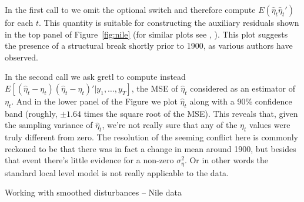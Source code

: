 \documentclass[a4paper]{article}
\begin{document}
In the first call to  we omit the optional switch and
therefore compute $E(\hat{\eta}_t\hat{\eta}_t')$ for each $t$. This
quantity is suitable for constructing the auxiliary residuals shown in
the top panel of Figure~\ref{fig:nile} (for similar plots see
\cite{koopman-etal99}, \cite{pelagatti11}).  This plot suggests the
presence of a structural break shortly prior to 1900, as various
authors have observed.

In the second  call we ask gretl to compute instead
$E[(\hat{\eta}_t-\eta_t)(\hat{\eta}_t-\eta_t)' | y_1,\ldots,y_T]$, the
MSE of $\hat{\eta}_t$ considered as an estimator of $\eta_t$. And in
the lower panel of the Figure we plot $\hat{\eta}_t$ along with a 90\%
confidence band (roughly, $\pm 1.64$ times the square root of the
MSE). This reveals that, given the sampling variance of
$\hat{\eta}_t$, we're not really sure that any of the $\eta_t$ values
were truly different from zero. The resolution of the seeming conflict
here is commonly reckoned to be that there was in fact a change in
mean around 1900, but besides that event there's little evidence for 
a non-zero $\sigma^2_{\eta}$. Or in other words the standard local level
model is not really applicable to the data.


\begin{script}[htbp]
  \caption{Working with smoothed disturbances -- Nile data}
  \label{script:auxres}
\end{script}
\end{document}
